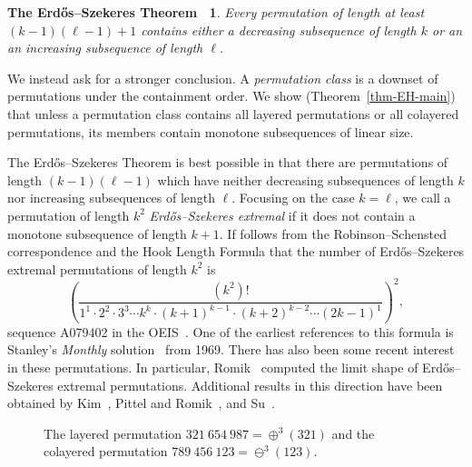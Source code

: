 \documentclass[
final
, nomarks
]{dmtcs-episciences}
\begin{document}
\newtheorem*{erdos-szekeres-theorem}{The Erd\H{o}s--Szekeres Theorem~\cite{erdos:a-combinatorial:}}
\begin{erdos-szekeres-theorem}
\emph{Every permutation of length at least $(k-1)(\ell-1)+1$ contains either a decreasing subsequence of length $k$ or an an increasing subsequence of length $\ell$.}
\end{erdos-szekeres-theorem}

We instead ask for a stronger conclusion. A \emph{permutation class} is a downset of permutations under the containment order. We show (Theorem~\ref{thm-EH-main}) that unless a permutation class contains all layered permutations or all colayered permutations, its members contain monotone subsequences of linear size.

The Erd\H{o}s--Szekeres Theorem is best possible in that there are permutations of length $(k-1)(\ell-1)$ which have neither decreasing subsequences of length $k$ nor increasing subsequences of length $\ell$. Focusing on the case $k=\ell$, we call a permutation of length $k^2$ \emph{Erd\H{o}s--Szekeres extremal} if it does not contain a monotone subsequence of length $k+1$. If follows from the Robinson--Schensted correspondence and the Hook Length Formula that the number of Erd\H{o}s--Szekeres extremal permutations of length $k^2$ is
\[
	\left(\frac%
	{(k^2)!}%
	{1^1\cdot 2^2\cdot 3^3\cdots k^k\cdot (k+1)^{k-1}\cdot (k+2)^{k-2}\cdots (2k-1)^1}%
	\right)^2,
\]
sequence A079402 in the OEIS~\cite{sloane:the-on-line-enc:}. One of the earliest references to this formula is Stanley's \emph{Monthly} solution~\cite{stanley:solution-to-pro:5641} from 1969. There has also been some recent interest in these permutations. In particular, Romik~\cite{romik:permutations-wi:} computed the limit shape of Erd\H{o}s--Szekeres extremal permutations. Additional results in this direction have been obtained by Kim~\cite{kim:on-increasing-s:}, Pittel and Romik~\cite{pittel:limit-shapes-fo:}, and Su~\cite{su:on-increasing-s:}.

\begin{figure}
\begin{center}
\quad\quad\quad\quad
\end{center}
\caption{The layered permutation $321\ 654\ 987=\oplus^3 (321)$ and the colayered permutation $789\ 456\ 123=\ominus^3 (123)$.}
\label{fig-layered-EES}
\end{figure}
\end{document}
